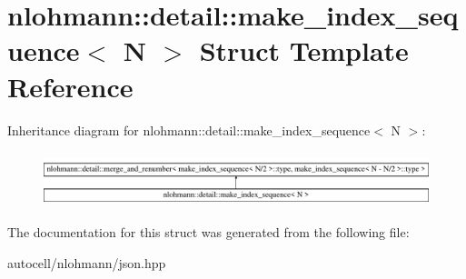 \hypertarget{structnlohmann_1_1detail_1_1make__index__sequence}{}\section{nlohmann\+:\+:detail\+:\+:make\+\_\+index\+\_\+sequence$<$ N $>$ Struct Template Reference}
\label{structnlohmann_1_1detail_1_1make__index__sequence}
Inheritance diagram for nlohmann\+:\+:detail\+:\+:make\+\_\+index\+\_\+sequence$<$ N $>$\+:\begin{figure}[H]
\begin{center}
\leavevmode
\includegraphics[height=1.597718cm]{structnlohmann_1_1detail_1_1make__index__sequence}
\end{center}
\end{figure}


The documentation for this struct was generated from the following file\+:\begin{DoxyCompactItemize}
\item 
autocell/nlohmann/json.\+hpp\end{DoxyCompactItemize}
